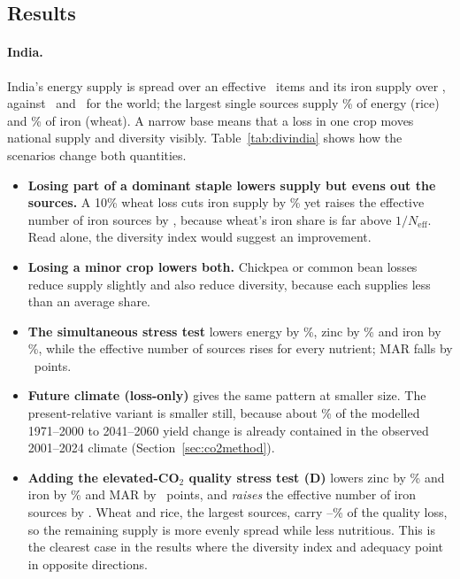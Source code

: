 \begin{table}[H]\centering\scriptsize
\caption[Crops covered by the diversity scenarios]{Crop--country pairs covered by the diversity scenarios. Scenario C
applies each pair's conditional yield loss; pairs with a projected gain are left out (loss-only).}\label{tab:divcover}
\end{table}

\subsection{Results}
\paragraph{India.} India's energy supply is spread over an effective \divIndBaseEffKcal\ items and its iron supply
over \divIndBaseEffIron, against \divWorldEffKcal\ and \divWorldEffIron\ for the world; the largest single sources
supply \divIndBaseTopKcal\% of energy (rice) and \divIndBaseTopIron\% of iron (wheat). A narrow base means that a
loss in one crop moves national supply and diversity visibly. Table~\ref{tab:divindia} shows how the scenarios change
both quantities.
\begin{itemize}
\item \textbf{Losing part of a dominant staple lowers supply but evens out the sources.} A 10\% wheat loss cuts
iron supply by \divIndWheatIronPctAbs\% yet raises the effective number of iron sources by \divIndWheatIronDEffAbs,
because wheat's iron share is far above $1/N_{\text{eff}}$. Read alone, the diversity index would suggest an
improvement.
\item \textbf{Losing a minor crop lowers both.} Chickpea or common bean losses reduce supply slightly and also
reduce diversity, because each supplies less than an average share.
\item \textbf{The simultaneous stress test} lowers energy by \divIndBKcalPctAbs\%, zinc by \divIndBZincPctAbs\% and iron by
\divIndBIronPctAbs\%, while the effective number of sources rises for every nutrient; MAR falls by \divIndBMARAbs\
points.
\item \textbf{Future climate (loss-only)} gives the same pattern at smaller size. The present-relative variant is
smaller still, because about \refShareOccurred\% of the modelled 1971--2000 to 2041--2060 yield change is already
contained in the observed 2001--2024 climate (Section~\ref{sec:co2method}).
\item \textbf{Adding the elevated-CO$_2$ quality stress test (D)} lowers zinc by \divIndDZincPctAbs\% and iron by
\divIndDIronPctAbs\% and MAR by \divIndDMARAbs\ points, and \emph{raises} the effective number of iron sources by
\divIndDIronDEffAbs. Wheat and rice, the largest sources, carry \cotwoIndWheatRiceMin--\cotwoIndWheatRiceMax\% of
the quality loss, so the remaining supply is more evenly spread while less nutritious. This is the clearest case in the results where the diversity index and
adequacy point in opposite directions.
\end{itemize}

